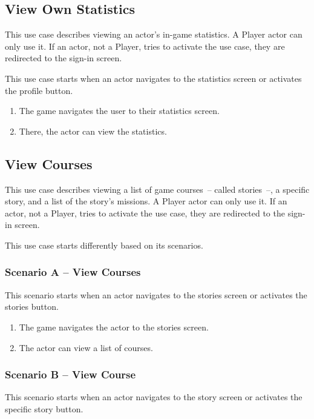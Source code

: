 \subsection{View Own Statistics}

This use case describes viewing an actor's in-game statistics.
A Player actor can only use it.
If an actor, not a Player, tries to activate the use case, they are redirected to the sign-in screen.

This use case starts when an actor navigates to the statistics screen or activates the profile button.

\begin{enumerate}
    \item The game navigates the user to their statistics screen.
    \item There, the actor can view the statistics.
\end{enumerate}

\pagebreak
\subsection{View Courses}

This use case describes viewing a list of game courses~-- called stories~--, a specific story, and a list of the story's missions.
A Player actor can only use it.
If an actor, not a Player, tries to activate the use case, they are redirected to the sign-in screen.

This use case starts differently based on its scenarios.

\subsubsection*{Scenario A -- View Courses}

This scenario starts when an actor navigates to the stories screen or activates the stories button.

\begin{enumerate}
    \item The game navigates the actor to the stories screen.
    \item The actor can view a list of courses.
\end{enumerate}

\subsubsection*{Scenario B -- View Course}

This scenario starts when an actor navigates to the story screen or activates the specific story button.

